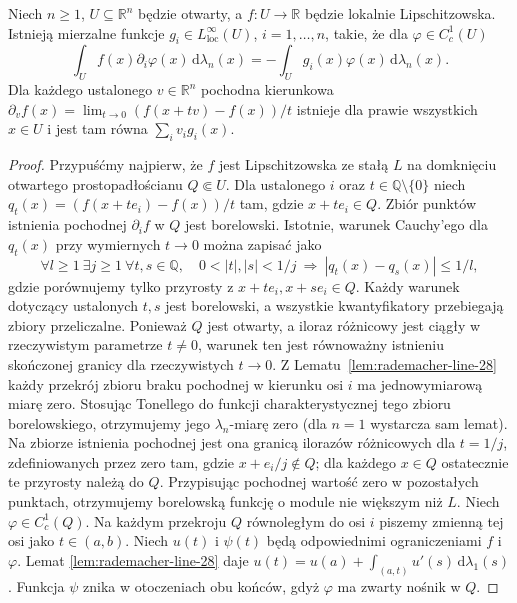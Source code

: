 \begin{lemat}
\label{lem:rademacher-direction-28}
Niech $n\ge1$, $U\subseteq\mathbb R^n$ będzie otwarty,
a $f:U\to\mathbb R$ będzie lokalnie Lipschitzowska.
Istnieją mierzalne funkcje $g_i\in L^\infty_{\mathrm{loc}}(U)$,
$i=1,\ldots,n$, takie, że dla $\varphi\in C_c^1(U)$
\[
 \int_U f(x)\partial_i\varphi(x)\,\mathrm d\lambda_n(x)
 =-\int_U g_i(x)\varphi(x)\,\mathrm d\lambda_n(x).
\]
Dla każdego ustalonego $v\in\mathbb R^n$ pochodna
kierunkowa $\partial_v f(x)=\lim_{t\to0}
(f(x+tv)-f(x))/t$ istnieje dla prawie wszystkich
$x\in U$ i jest tam równa $\sum_i v_i g_i(x)$.
\end{lemat}
\begin{proof}
Przypuśćmy najpierw, że $f$ jest Lipschitzowska
ze stałą $L$ na domknięciu otwartego prostopadłościanu
$Q\Subset U$. Dla ustalonego $i$ oraz $t\in\mathbb Q\setminus\{0\}$
niech $q_t(x)=(f(x+te_i)-f(x))/t$ tam, gdzie $x+te_i\in Q$.
Zbiór punktów istnienia pochodnej $\partial_i f$ w $Q$
jest borelowski. Istotnie, warunek Cauchy'ego dla
$q_t(x)$ przy wymiernych $t\to0$ można zapisać jako
\[
 \forall l\ge1\ \exists j\ge1\
 \forall t,s\in\mathbb Q,\quad
 0<|t|,|s|<1/j\ \Longrightarrow\ |q_t(x)-q_s(x)|\le1/l,
\]
gdzie porównujemy tylko przyrosty z $x+te_i,x+se_i\in Q$.
Każdy warunek dotyczący ustalonych $t,s$ jest borelowski,
a wszystkie kwantyfikatory przebiegają zbiory przeliczalne.
Ponieważ $Q$ jest otwarty, a iloraz różnicowy jest ciągły
w rzeczywistym parametrze $t\ne0$, warunek ten jest
równoważny istnieniu skończonej granicy dla rzeczywistych
$t\to0$. Z Lematu~\ref{lem:rademacher-line-28} każdy
przekrój zbioru braku pochodnej w kierunku osi $i$ ma
jednowymiarową miarę zero. Stosując Tonellego do funkcji
charakterystycznej tego zbioru borelowskiego, otrzymujemy
jego $\lambda_n$-miarę zero (dla $n=1$ wystarcza sam lemat).
Na zbiorze istnienia pochodnej jest ona granicą
ilorazów różnicowych dla $t=1/j$, zdefiniowanych przez
zero tam, gdzie $x+e_i/j\notin Q$; dla każdego $x\in Q$
ostatecznie te przyrosty należą do $Q$.
Przypisując pochodnej wartość zero w pozostałych punktach,
otrzymujemy borelowską funkcję o module nie większym
niż $L$. Niech $\varphi\in C_c^1(Q)$.
Na każdym przekroju $Q$ równoległym do osi $i$
piszemy zmienną tej osi jako $t\in(a,b)$.
Niech $u(t)$ i $\psi(t)$ będą odpowiednimi
ograniczeniami $f$ i $\varphi$. Lemat
\ref{lem:rademacher-line-28} daje
$u(t)=u(a)+\int_{(a,t)}u'(s)\,\mathrm d\lambda_1(s)$.
Funkcja $\psi$ znika w otoczeniach obu końców,
gdyż $\varphi$ ma zwarty nośnik w $Q$.

\end{proof}
